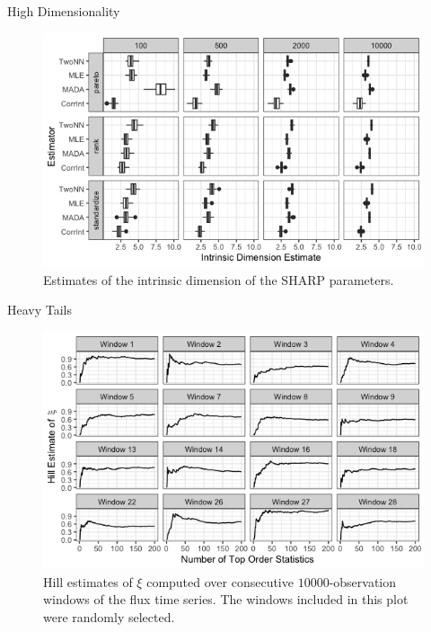 \documentclass{beamer}
\begin{document}
\begin{frame}{High Dimensionality}
    \begin{figure}[!htb]
        \centering
        \includegraphics[scale=0.5]{intrinsic_dim_ests.png}
        \caption{Estimates of the intrinsic dimension of the SHARP parameters.}
        \label{fig:intrinsic_dim_ests}
    \end{figure}
\end{frame}

\begin{frame}{Heavy Tails}
    \begin{figure}[h!]
        \centering
        \includegraphics[scale=0.4]{hill_ests.png}
        \caption{Hill estimates of $\xi$ computed over consecutive $\num[group-separator={,}]{10000}$-observation windows of the flux time series. The windows included in this plot were randomly selected.}
        \label{fig:hill_ests}
    \end{figure}
\end{frame}
\end{document}
